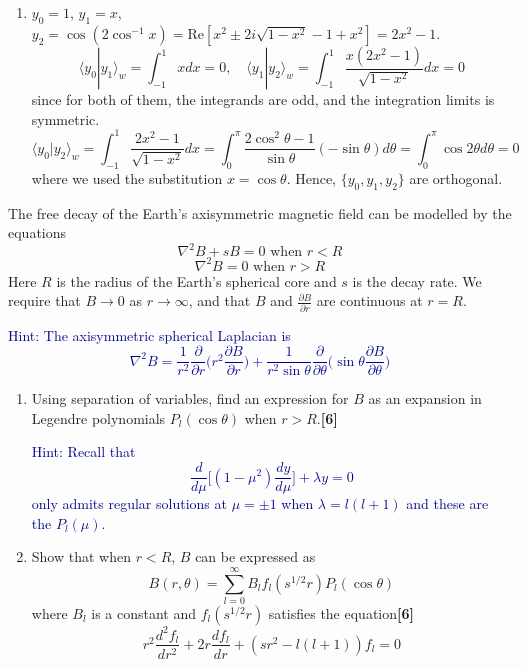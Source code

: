 \documentclass[a4paper]{article}
\begin{document}
\begin{ans}
\begin{enumerate}[label=(\alph*)]
\begin{enumerate}[label=(\alph*)]
\item $y_0=1$, $y_1=x$, $y_2=\cos(2\cos^{-1}x)=\text{Re}[x^2\pm 2i\sqrt{1-x^2}-1+x^2]=2x^2-1$. 
$$\langle y_0|y_1\rangle_w=\int_{-1}^1xdx=0,\quad\langle y_1|y_2\rangle_w=\int_{-1}^1\frac{x(2x^2-1)}{\sqrt{1-x^2}}dx=0$$
since for both of them, the integrands are odd, and the integration limits is symmetric. 
$$\langle y_0|y_2\rangle_w=\int_{-1}^1\frac{2x^2-1}{\sqrt{1-x^2}}dx=\int_0^\pi\frac{2\cos^2\theta-1}{\sin\theta}(-\sin\theta)d\theta=\int_0^\pi\cos2\theta d\theta=0$$
where we used the substitution $x=\cos\theta$. Hence, $\{y_0,y_1,y_2\}$ are orthogonal.
\end{enumerate}
\end{enumerate}
\end{ans}
\begin{qns}
The free decay of the Earth’s axisymmetric magnetic field can be modelled by the equations
$$\nabla^2B+sB=0\text{ when }r<R$$
$$\nabla^2B=0\text{   when }r>R$$
Here $R$ is the radius of the Earth’s spherical core and $s$ is the decay rate. We require that $B\rightarrow0$ as $r\rightarrow\infty$, and that $B$ and $\frac{\partial B}{\partial r}$ are continuous at $r = R$.

\begin{mdframed}
\textcolor{darkblue}{Hint: The axisymmetric spherical Laplacian is
$$\nabla^2B=\frac{1}{r^2}\frac{\partial}{\partial r}\bigg(r^2\frac{\partial B}{\partial r}\bigg)+\frac{1}{r^2\sin\theta}\frac{\partial}{\partial\theta}\bigg(\sin\theta\frac{\partial B}{\partial\theta}\bigg)$$}
\end{mdframed}
\begin{enumerate}[label=(\roman*)]
\item Using separation of variables, find an expression for $B$ as an expansion in Legendre polynomials $P_l(\cos\theta)$ when $r > R$.\hfill\textbf{[6]}
\begin{mdframed}
\textcolor{darkblue}{Hint: Recall that
$$\frac{d}{d\mu}\bigg[(1-\mu^2)\frac{dy}{d\mu}\bigg]+\lambda y=0$$
only admits regular solutions at $\mu=\pm1$ when $\lambda=l(l+1)$ and these are the $P_l(\mu)$.}
\end{mdframed}
\item Show that when $r < R$, $B$ can be expressed as
$$B(r,\theta)=\sum_{l=0}^\infty B_lf_l(s^{1/2}r)P_l(\cos\theta)$$
where $B_l$ is a constant and $f_l(s^{1/2} r)$ satisfies the equation\hfill\textbf{[6]}
$$r^2\frac{d^2f_l}{dr^2}+2r\frac{df_l}{dr}+(sr^2-l(l+1))f_l=0$$


\end{enumerate}
\end{qns}
\end{document}
